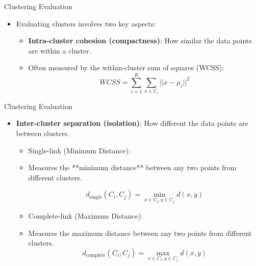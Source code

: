 \documentclass[serif, aspectratio=169]{beamer}
\begin{document}
\begin{frame}{Clustering Evaluation}
    \begin{itemize}
        \item Evaluating clusters involves two key aspects:
        \begin{itemize}
            \item \textbf{Intra-cluster cohesion (compactness)}: How similar the data points are within a cluster.
            \item Often measured by the within-cluster sum of squares (WCSS):
            $$
            WCSS = \sum_{i=1}^K \sum_{x \in C_i} ||x-\mu_i||^2
            $$
        \end{itemize}
    \end{itemize}
\end{frame}


\begin{frame}{Clustering Evaluation}
    \begin{itemize}
        \item \textbf{Inter-cluster separation (isolation)}: How different the data points are between clusters.
        
        \begin{itemize}
          \item Single-link (Minimum Distance):
            \item Measures the **minimum distance** between any two points from different clusters.

            \[
            d_{\text{single}}(C_i, C_j) = \min_{x \in C_i, y \in C_j} d(x, y)
            \]
        
        \item Complete-link (Maximum Distance):
            \item Measures the maximum distance between any two points from different clusters.
            \[
            d_{\text{complete}}(C_i, C_j) = \max_{x \in C_i, y \in C_j} d(x, y)
            \]
        \end{itemize}
    \end{itemize}
\end{frame}
\end{document}
